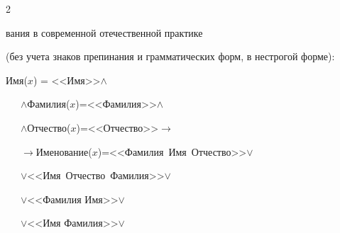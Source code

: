 \begin{multicols}{2}
\noindent


вания в современной отечественной практике 


(без учета знаков препинания и грамматических форм, в нестрогой форме):










\smallskip





\noindent


Имя($x$) = <<Имя>>\;$\wedge$\; %





\noindent


\ \ \ $\wedge$\;Фамилия($x$)\;=\;<<Фамилия>>\;$\wedge$ %





\noindent


\ \ \ $\wedge$\;Отчество($x$)\;=\;<<Отчество>>\;$\rightarrow$ %







\noindent


\ \ \ $\rightarrow$\;Именование($x$)\;=\;<<Фамилия\ Имя\ Отчество>>\;$\vee$ %





\noindent


\ \ \ $\vee$\;<<Имя\  Отчество\ Фамилия>>\;$\vee$ %





\noindent


\ \ \ $\vee$\;<<Фамилия Имя>>\;$\vee$ %





\noindent


\ \ \ $\vee$\;<<Имя Фамилия>>\;$\vee$ %






\end{multicols}
